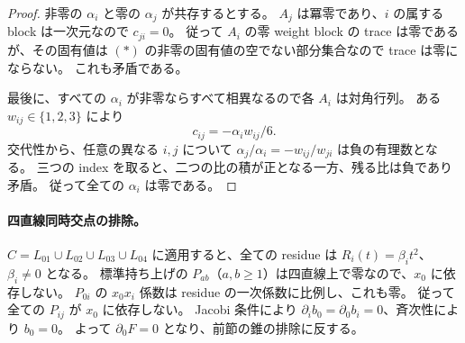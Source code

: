 \begin{proof}
非零の $\alpha_i$ と零の $\alpha_j$ が共存するとする。
$A_j$ は冪零であり、$i$ の属する block は一次元なので $c_{ji}=0$。
従って $A_i$ の零 weight block の trace は零であるが、その固有値は
$(*)$ の非零の固有値の空でない部分集合なので trace は零にならない。
これも矛盾である。

最後に、すべての $\alpha_i$ が非零ならすべて相異なるので各 $A_i$ は対角行列。
ある $w_{ij}\in\{1,2,3\}$ により
\[
 c_{ij}=-\alpha_i w_{ij}/6.
\]
交代性から、任意の異なる $i,j$ について
$\alpha_j/\alpha_i=-w_{ij}/w_{ji}$ は負の有理数となる。
三つの index を取ると、二つの比の積が正となる一方、残る比は負であり矛盾。
従って全ての $\alpha_i$ は零である。
\end{proof}


\paragraph{四直線同時交点の排除。}
$C=L_{01}\cup L_{02}\cup L_{03}\cup L_{04}$ に適用すると、全ての residue は
$R_i(t)=\beta_i t^2$、$\beta_i\ne0$ となる。
標準持ち上げの $P_{ab}$（$a,b\ge1$）は四直線上で零なので、$x_0$ に依存しない。
$P_{0i}$ の $x_0x_i$ 係数は residue の一次係数に比例し、これも零。
従って全ての $P_{ij}$ が $x_0$ に依存しない。
Jacobi 条件により $\partial_i b_0=\partial_0b_i=0$、斉次性により $b_0=0$。
よって $\partial_0F=0$ となり、前節の錐の排除に反する。
